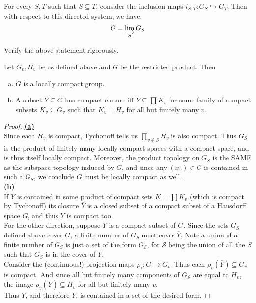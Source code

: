 \documentclass[11pt, x11names]{book}
\newcommand{\fans}{\mathscr{S}}
\newcommand{\inj}{\hookrightarrow}
\newcommand{\dlim}{\varinjlim}
\renewcommand{\bar}[1]{\overline{#1}}
\begin{document}
For every $S, T$ such that $S \subseteq T$, consider the inclusion maps $i_{S, T}: G_S \inj G_T$. Then with respect to this directed system, we have:
\begin{equation*}
    G = \dlim_{S} G_S
\end{equation*}

\begin{exercise}
\label{restricted product as colimit}
    Verify the above statement rigorously.
\end{exercise}

\begin{prop}
\label{restricted product properties}
Let $G_v, H_v$ be as defined above and $G$ be the restricted product. Then
\begin{enumerate}[(a)]
    \item $G$ is a locally compact group.
    \item A subset $Y \subseteq G$ has compact closure iff $Y \subseteq \prod K_v$ for some family of compact subsets $K_v \subseteq G_v$ such that $K_v = H_v$ for all but finitely many $v$.
\end{enumerate}
\end{prop}
\begin{proof}
\textbf{\underline{(a)}}\\
Since each $H_v$ is compact, Tychonoff tells us $\prod_{v \notin S} H_v$ is also compact. Thus $G_S$ is the product of finitely many locally compact spaces with a compact space, and is thus itself locally compact. Moreover, the product topology on $G_S$ is the SAME as the subspace topology induced by $G$, and since any $(x_v) \in G$ is contained in such a $G_S$, we conclude $G$ must be locally compact as well.\\

\textbf{\underline{(b)}}\\
If $Y$ is contained in some product of compact sets $ K = \prod K_v$ (which is compact by Tychonoff) its closure $\bar{Y}$ is a closed subset of a compact subset of a Hausdorff space $G$, and thus $\bar{Y}$ is compact too.\\
For the other direction, suppose $\bar{Y}$ is a compact subset of $G$. Since the sets $G_S$ defined above cover $G$, a finite number of $G_S$ must cover $\bar{Y}$. Note a union of a finite number of $G_S$ is just a set of the form $G_{\fans}$, for $\fans$ being the union of all the $S$ such that $G_S$ is in the cover of $\bar{Y}$.\\
Consider the (continuous!) projection maps $\rho_v: G \to G_v$. Thus each $\rho_v(\bar{Y}) \subseteq G_v$ is compact. And since all but finitely many components of $G_{\fans}$ are equal to $H_v$, the image $\rho_v(\bar{Y}) \subseteq H_v$ for all but finitely many $v$.\\
Thus $\bar{Y}$, and therefore $Y$, is contained in a set of the desired form.
\end{proof}
\end{document}
